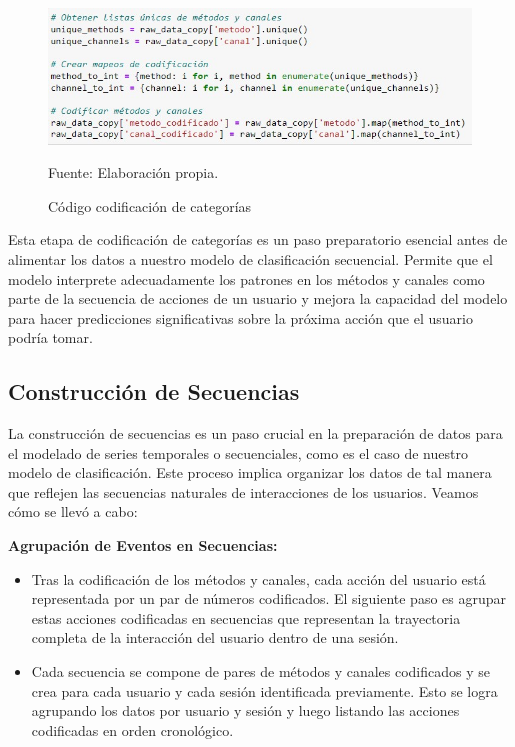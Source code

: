 \begin{figure}[H]
    \begin{minipage}[t]{0.9\textwidth}
        \caption{Código codificación de categorías}
        \label{codificación_categorias}        
    \end{minipage}

    \vspace{10pt}

    \begin{minipage}[b]{1\textwidth}
        \centering
        \includegraphics[width=\textwidth]{img/Código codificación categorias.jpg}        
    \end{minipage}

    \begin{minipage}[t]{0.9\textwidth}
        Fuente: Elaboración propia.
    \end{minipage}
\end{figure}

Esta etapa de codificación de categorías es un paso preparatorio esencial antes de alimentar los datos a nuestro modelo de clasificación secuencial. Permite que el modelo interprete adecuadamente los patrones en los métodos y canales como parte de la secuencia de acciones de un usuario y mejora la capacidad del modelo para hacer predicciones significativas sobre la próxima acción que el usuario podría tomar.

\subsection{Construcción de Secuencias}

La construcción de secuencias es un paso crucial en la preparación de datos para el modelado de series temporales o secuenciales, como es el caso de nuestro modelo de clasificación. Este proceso implica organizar los datos de tal manera que reflejen las secuencias naturales de interacciones de los usuarios. Veamos cómo se llevó a cabo:

\textbf{Agrupación de Eventos en Secuencias:}

\begin{itemize}
    \item Tras la codificación de los métodos y canales, cada acción del usuario está representada por un par de números codificados. El siguiente paso es agrupar estas acciones codificadas en secuencias que representan la trayectoria completa de la interacción del usuario dentro de una sesión.
    \item Cada secuencia se compone de pares de métodos y canales codificados y se crea para cada usuario y cada sesión identificada previamente. Esto se logra agrupando los datos por usuario y sesión y luego listando las acciones codificadas en orden cronológico.
\end{itemize}

